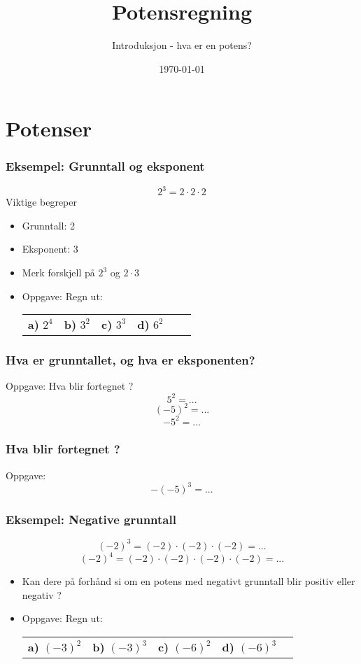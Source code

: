 \documentclass{beamer}
\title{Potensregning}
\subtitle{Introduksjon - hva er en potens?}
\date{\today}
\theoremstyle{definition}
\begin{document}
\frame{\titlepage}


\section{Potenser}

\begin{frame}
\frametitle{Eksempel: Grunntall og eksponent}
\huge\[2^3 = 2\cdot2\cdot2 \]
\normalsize
Viktige begreper
\begin{itemize}
\item<2-> Grunntall: 2
\item<3-> Eksponent: 3
\item<4-> Merk forskjell på $\displaystyle 2^3$ og $\displaystyle 2\cdot3$
\item<5->
Oppgave: Regn ut:
\begin{center}
\begin{tabular}{l l l l l l}
\textbf{a)} $2^4$ &
\textbf{b)} $3^2$ &
\textbf{c)} $3^3$ &
\textbf{d)} $6^2$
\end{tabular}
\end{center}
\end{itemize}
\end{frame}

\begin{frame}
\frametitle{Hva er grunntallet, og hva er eksponenten?}
Oppgave: Hva blir fortegnet ? 
\huge\[5^2 = ... \]
\huge\[(-5)^2 = ... \]
\huge\[-5^2 = ... \]
\end{frame}


\begin{frame}
\frametitle{Hva blir fortegnet ?}
Oppgave: 
\huge\[-(-5)^3 = ... \]
\end{frame}

\begin{frame}
\frametitle{Eksempel: Negative grunntall}
\huge\[(-2)^3 = (-2)\cdot(-2)\cdot(-2) = ... \]
\huge\[(-2)^4 = (-2)\cdot(-2)\cdot(-2)\cdot(-2) = ... \]
\normalsize
\begin{itemize}
\item<2-> Kan dere på forhånd si om en potens med negativt grunntall blir positiv eller negativ ?
\item<3-> Oppgave: Regn ut:
\begin{center}
\begin{tabular}{l l l l l}
\textbf{a)} $(-3)^2$ &
\textbf{b)} $(-3)^3$ &
\textbf{c)} $(-6)^2$ &
\textbf{d)} $(-6)^3$
\end{tabular}
\end{center}
\end{itemize}
\end{frame}
\end{document}
